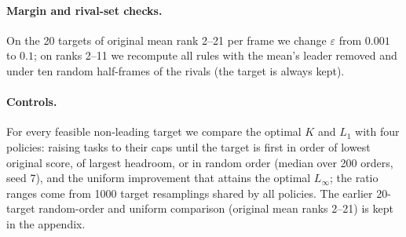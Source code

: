\paragraph{Margin and rival-set checks.}
On the 20 targets of original mean rank 2--21 per frame we change $\varepsilon$ from $0.001$ to $0.1$; on ranks 2--11 we recompute all rules with the mean's leader removed and under ten random half-frames of the rivals (the target is always kept).

\paragraph{Controls.}
For every feasible non-leading target we compare the optimal $K$ and $L_1$ with four policies: raising tasks to their caps until the target is first in order of lowest original score, of largest headroom, or in random order (median over 200 orders, seed 7), and the uniform improvement that attains the optimal $L_\infty$; the ratio ranges come from 1000 target resamplings shared by all policies. The earlier 20-target random-order and uniform comparison (original mean ranks 2--21) is kept in the appendix.
